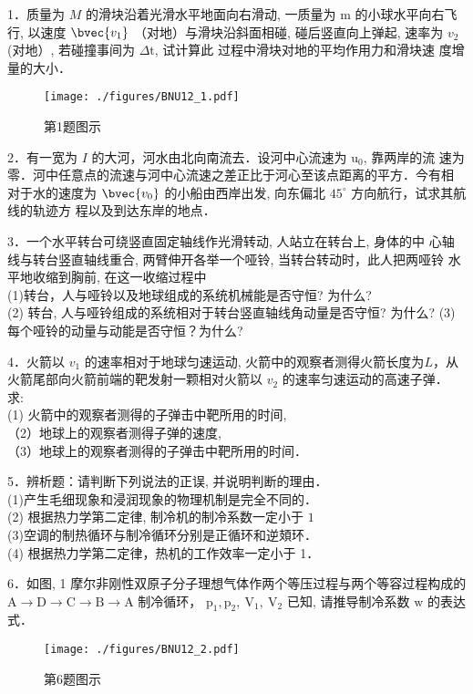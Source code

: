
1．质量为 $M$ 的滑块沿着光滑水平地面向右滑动, 一质量为 $\mathrm{m}$ 的小球水平向右飞行, 以速度 $\bvec{v_1}$ （对地）与滑块沿斜面相碰, 碰后竖直向上弹起, 速率为
$v_2$ (对地）, 若碰撞事间为 $\Delta \mathrm{t}$, 试计算此 过程中滑块对地的平均作用力和滑块速
度增量的大小．
\begin{figure}[ht]
\centering
\texttt{[image: ./figures/BNU12\_1.pdf]}
\caption{第1题图示} \label{BNU12_fig1}
\end{figure}

2．有一宽为 $I$ 的大河，河水由北向南流去．设河中心流速为 $\mathrm{u}_{0}$, 靠两岸的流 速为零．河中任意点的流速与河中心流速之差正比于河心至该点距离的平方．今有相 对于水的速度为 $\bvec{v_0}$ 的小船由西岸出发, 向东偏北 $45^{\circ}$ 方向航行，试求其航线的轨迹方 程以及到达东岸的地点．

3．一个水平转台可绕竖直固定轴线作光滑转动, 人站立在转台上, 身体的中 心轴线与转台竖直轴线重合, 两臂伸开各举一个哑铃, 当转台转动时，此人把两哑铃 水平地收缩到胸前, 在这一收缩过程中\\
(1)转台，人与哑铃以及地球组成的系统机械能是否守恒? 为什么?\\
(2) 转台, 人与哑铃组成的系统相对于转台竖直轴线角动量是否守恒? 为什么?
(3)每个哑铃的动量与动能是否守恒？为什么?

4．火箭以 $v_1$ 的速率相对于地球匀速运动, 火箭中的观察者测得火箭长度为$L$，从火箭尾部向火箭前端的靶发射一颗相对火箭以 $v_{2}$ 的速率匀速运动的高速子弹． 求: \\(1) 火箭中的观察者测得的子弹击中靶所用的时间, \\（2）地球上的观察者测得子弹的速度, \\（3）地球上的观察者测得的子弹击中靶所用的时间．

5．辨析题：请判断下列说法的正误, 并说明判断的理由．\\
(1)产生毛细现象和浸润现象的物理机制是完全不同的．\\
(2) 根据热力学第二定律, 制冷机的制冷系数一定小于 $1$\\
(3)空调的制热循环与制冷循环分别是正循环和逆頍环．\\
(4) 根据热力学第二定律，热机的工作效率一定小于 1．

6．如图, 1 摩尔非刚性双原子分子理想气体作两个等压过程与两个等容过程构成的 $\mathrm{A} \rightarrow \mathrm{D} \rightarrow \mathrm{C} \rightarrow \mathrm{B} \rightarrow \mathrm{A}$
制冷循环， $\mathrm{p}_{1}, \mathrm{p}_{2}, \mathrm{~V}_{1}, \mathrm{~V}_{2}$ 已知, 请推导制冷系数 $\mathrm{w}$ 的表达式．
\begin{figure}[ht]
\centering
\texttt{[image: ./figures/BNU12\_2.pdf]}
\caption{第6题图示} \label{BNU12_fig2}
\end{figure}

